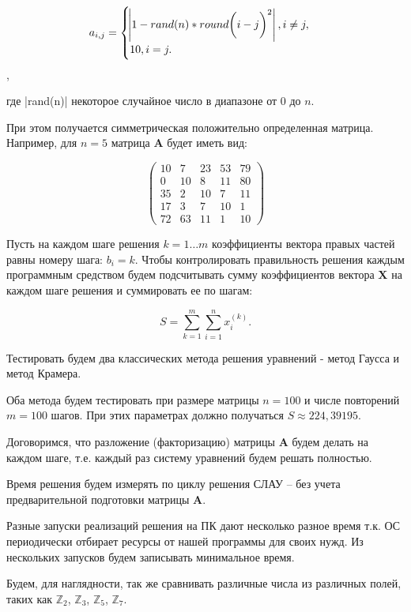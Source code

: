 \documentclass[master, och, diploma, times]{sty/SCWorks}
\theoremstyle{plain}
\theoremstyle{definition}
\begin{document}
$$
a_{i,j}= 
\begin{cases} 
\abs{1-rand(n)*round\bigg(i-j\bigg)^2}, i \neq j, \\ 
10, i = j.
\end{cases}
$$,

\noindent где |rand(n)| некоторое случайное число в диапазоне от $0$ до $n$.

При этом получается симметрическая положительно определенная матрица.
Например, для $n=5$ матрица $\boldsymbol{A}$ будет иметь вид:

$$
\begin{pmatrix}
  10 & 7 & 23 & 53 & 79 \\
  0 & 10 & 8 & 11 & 80 \\
  35 & 2 & 10 & 7 & 11 \\
  17 & 3 & 7 & 10 & 1 \\
  72 & 63 & 11 & 1 & 10
\end{pmatrix}
$$

Пусть на каждом шаге решения $k=1 \dots m$ коэффициенты вектора правых частей равны номеру шага: $b_i = k$.
Чтобы контролировать правильность решения каждым программным средством будем подсчитывать сумму коэффициентов вектора $\boldsymbol{X}$ на каждом шаге решения и суммировать ее по шагам:

$$
S = \sum\limits_{k=1}^{m}\sum\limits_{i=1}^{n} x_i^{(k)}.
$$

Тестировать будем два классических метода решения уравнений - метод Гаусса и метод Крамера.

Оба метода будем тестировать при размере матрицы $n=100$ и числе повторений $m=100$ шагов. При этих параметрах должно получаться $S\approx 224,39195$.

Договоримся, что разложение (факторизацию) матрицы $\boldsymbol{A}$ будем делать на каждом шаге, т.е. каждый раз систему уравнений будем решать полностью.

Время решения будем измерять по циклу решения СЛАУ – без учета предварительной подготовки матрицы $\boldsymbol{A}$.

Разные запуски реализаций решения на ПК дают несколько разное время т.к. ОС периодически отбирает ресурсы от нашей программы для своих нужд. Из нескольких запусков будем записывать минимальное время.

Будем, для наглядности, так же сравнивать различные числа из различных полей, таких как $\mathbb{Z}_2$, $\mathbb{Z}_3$, $\mathbb{Z}_5$, $\mathbb{Z}_7$.
 
\end{document}
